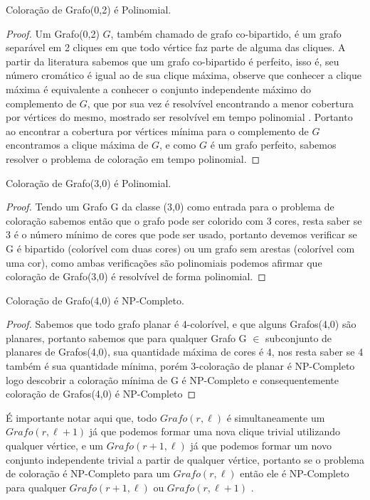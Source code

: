 	\begin{teorema}
		Coloração de Grafo(0,2) é Polinomial.
	\end{teorema}
	\begin{proof}
		Um Grafo(0,2) $G$, também chamado de grafo co-bipartido, é um grafo separável em 2 cliques em que todo vértice faz parte de alguma das cliques. A partir da literatura \cite{bollo98} sabemos que um grafo co-bipartido é perfeito, isso é, seu número cromático é igual ao de sua clique máxima, observe que conhecer a clique máxima é equivalente a conhecer o conjunto independente máximo do complemento de $G$, que por sua vez é resolvível encontrando a menor cobertura por vértices do mesmo, mostrado ser resolvível em tempo polinomial \cite{konig31,zing12}. Portanto ao encontrar a cobertura por vértices mínima para o complemento de $G$ encontramos a clique máxima de $G$, e como $G$ é um grafo perfeito, sabemos resolver o problema de coloração em tempo polinomial.
	\end{proof}

	\begin{teorema}
		Coloração de Grafo(3,0) é Polinomial.
	\end{teorema}
	\begin{proof}
		Tendo um Grafo G da classe (3,0) como entrada para o problema de coloração sabemos então que o grafo pode ser colorido com 3 cores, resta saber se 3 é o número mínimo de cores que pode ser usado, portanto devemos verificar se G é bipartido (colorível com duas cores) ou um grafo sem arestas (colorível com uma cor), como ambas verificações são polinomiais podemos afirmar que coloração de Grafo(3,0) é resolvível de forma polinomial.
	\end{proof}

	\begin{teorema}
		Coloração de Grafo(4,0) é NP-Completo.
	\end{teorema}
	\begin{proof}
		Sabemos que todo grafo planar é 4-colorível, e que alguns Grafos(4,0) são planares, portanto sabemos que para qualquer Grafo G $\in$ subconjunto de planares de Grafos(4,0), sua quantidade máxima de cores é 4, nos resta saber se 4 também é sua quantidade mínima, porém 3-coloração de planar é NP-Completo logo descobrir a coloração mínima de G é NP-Completo e consequentemente coloração de Grafos(4,0) é NP-Completo
	\end{proof}

É importante notar aqui que, todo $Grafo(r,\ell)$ é simultaneamente um $Grafo(r,\ell+1)$ já que podemos formar uma nova clique trivial utilizando qualquer vértice, e um $Grafo(r+1,\ell)$ já que podemos formar um novo conjunto independente trivial a partir de qualquer vértice, portanto se o problema de coloração é NP-Completo para um $Grafo(r,\ell)$ então ele é NP-Completo para qualquer $Grafo(r+1,\ell)$ ou $Grafo(r,\ell+1)$ .

